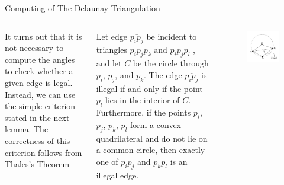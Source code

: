 \begin{frame}{Computing of The Delaunay Triangulation}
    \begin{columns}
        It turns out that it is not necessary to compute the angles to check whether a given edge is legal. Instead, we can use the simple criterion
stated in the next lemma. The correctness of this criterion follows from Thales's Theorem
\begin{block}{}
         Let edge $\overline{p_i p_j}$ be incident to triangles $p_i p_j p_k$ and $p_i p_j p_l$
, and let $C$ be the circle through $p_i$, $p_j$, and $p_k$. 
The edge $\overline{p_i p_j}$ is illegal if and only if the point $p_l$
lies in the interior of $C$. Furthermore, if the points $p_i$, $p_j$, $p_k$, $p_l$ form
a convex quadrilateral and do not lie on a common circle, then exactly one of
$\overline{p_i p_j}$ and $\overline{p_k p_l}$ is an illegal edge.
\end{block}
        \begin{figure}
            \centering
            \includegraphics[width=\textwidth]{figs/L07-delaunay-triangulation-illegal.png}
        \end{figure}
    \end{columns}
\end{frame}

